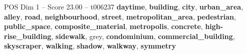 \begin{textsample}{POS Dim 1 – Score 23.00 – t006237}  \label{ex:f1_pos_009}
\textbf{daytime}, \textbf{building}, \textbf{city}, \textbf{urban\_area}, \textbf{alley}, \textbf{road}, \textbf{neighbourhood}, \textbf{street}, \textbf{metropolitan\_area}, \textbf{pedestrian}, \textbf{public\_space}, \textbf{composite\_material}, \textbf{metropolis}, \textbf{concrete}, \textbf{high-rise\_building}, \textbf{sidewalk}, grey, \textbf{condominium}, \textbf{commercial\_building}, \textbf{skyscraper}, \textbf{walking}, \textbf{shadow}, \textbf{walkway}, \textbf{symmetry}

\end{textsample}
